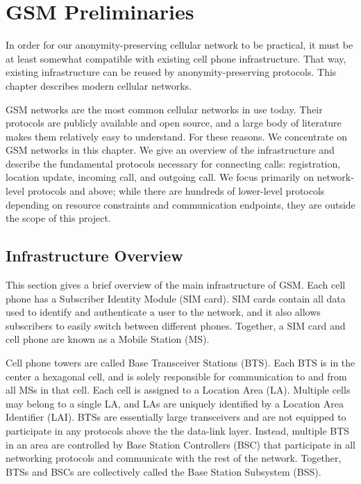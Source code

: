 \documentclass[11pt]{article}
\begin{document}
\appendix

\section{GSM Preliminaries}

In order for our anonymity-preserving cellular network to be practical, it must be at least somewhat compatible with existing cell phone infrastructure. That way, existing infrastructure can be reused by anonymity-preserving protocols. This chapter describes modern cellular networks. 

GSM networks are the most common cellular networks in use today. Their protocols are publicly available and open source, and a large body of literature makes them relatively easy to understand. For these reasons. We concentrate on GSM networks in this chapter. We give an overview of the infrastructure and describe the fundamental protocols necessary for connecting calls: registration, location update, incoming call, and outgoing call. We focus primarily on network-level protocols and above; while there are hundreds of lower-level protocols depending on resource constraints and communication endpoints, they are outside the scope of this project. 

\subsection{Infrastructure Overview}
This section gives a brief overview of the main infrastructure of GSM. Each cell phone has a Subscriber Identity Module (SIM card). SIM cards contain all data used to identify and authenticate a user to the network, and it also allows subscribers to easily switch between different phones. Together, a SIM card and cell phone are known as a Mobile Station (MS).  

Cell phone towers are called Base Transceiver Stations (BTS). Each BTS is in the center a hexagonal cell, and is solely responsible for communication to and from all MSs in that cell. Each cell is assigned to a Location Area (LA). Multiple cells may belong to a single LA, and LAs are uniquely identified by a Location Area Identifier (LAI). BTSs are essentially large transceivers and are not equipped to participate in any protocols above the the data-link layer. Instead, multiple BTS in an area are controlled by Base Station Controllers (BSC) that participate in all networking protocols and communicate with the rest of the network. Together, BTSs and BSCs are collectively called the Base Station Subsystem (BSS). 
\end{document}
